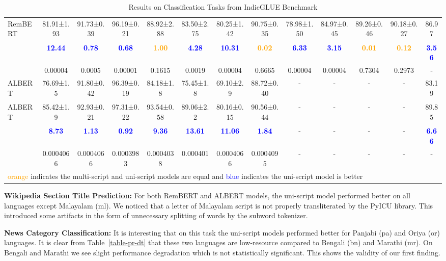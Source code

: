 \documentclass[11pt]{article}
\begin{document}
\begin{table*}[hbt!]
\begin{adjustbox}{max width=\textwidth}
\begin{tabular}{l c c c c c c c c c c c c}
RemBERT\textsubscript{}   & 81.91±1.93 & 91.73±0.39 & 96.19±0.21 & 88.92±2.88 & 83.50±2.75 & 80.25±1.42 & 90.75±0.35 & 78.98±1.50 & 84.97±0.45 & 89.26±0.46 & 90.18±0.27 & 86.97\\
 &\textcolor{blue}{\textbf{12.44}}	&\textcolor{blue}{\textbf{0.78}}	&\textcolor{blue}{\textbf{0.68}}	&\textcolor{orange}{\textbf{1.00}}	&\textcolor{blue}{\textbf{4.28}}	&\textcolor{blue}{\textbf{10.31}}	&\textcolor{orange}{\textbf{0.02}} &\textcolor{blue}{\textbf{6.33}} &\textcolor{blue}{\textbf{3.15}} &\textcolor{orange}{\textbf{0.01}} &\textcolor{orange}{\textbf{0.12}} & \textcolor{blue}{\textbf{3.56}} \\
 &0.00004	&0.0005	&0.00001	&0.1615	&0.0019	&0.00004	&0.6665 &0.00004 &0.00004 & 0.7304 & 0.2973 & -\\
\midrule[1pt]
ALBERT\textsubscript{}           & 76.69±1.5 & 91.80±0.42 & 96.39±0.19 & 84.18±1.8 & 75.45±1.8 & 69.10±2.9 & 88.72±0.40 & - &- & - & - & 83.19\\
ALBERT\textsubscript{}   & 85.42±1.9 & 92.93±0.21 & 97.31±0.22 & 93.54±0.58 & 89.06±2.2 & 80.16±0.15 & 90.56±0.44 & - &- & - & - & 89.85\\
 & \textcolor{blue}{\textbf{8.73}} & \textcolor{blue}{\textbf{1.13}} & \textcolor{blue}{\textbf{0.92}} & \textcolor{blue}{\textbf{9.36}} & \textcolor{blue}{\textbf{13.61}} & \textcolor{blue}{\textbf{11.06}} & \textcolor{blue}{\textbf{1.84}} & - & - & - & - & \textcolor{blue}{\textbf{6.66}}\\
 & 0.0004066	& 0.0004066	& 0.0003983	& 0.0004038	& 0.000401	& 0.0004066	& 0.0004095 & - & - & - & - & -\\
\bottomrule[2pt]
\multicolumn{13}{l}{\textcolor{orange}{orange} indicates the multi-script and uni-script models are equal and \textcolor{blue}{blue} indicates the uni-script model is better}
\end{tabular}\end{adjustbox}
\caption{Results on Classification Tasks from IndicGLUE Benchmark}
\label{table-res}
\end{table*}


\textbf{Wikipedia Section Title Prediction:}
For both RemBERT and ALBERT models, the uni-script model performed better on all languages except Malayalam (ml). We noticed that a letter of Malayalam script is not properly transliterated by the PyICU library. This introduced some artifacts in the form of unnecessary splitting of words by the subword tokenizer.

\textbf{News Category Classification:} 
It is interesting that on this task the uni-script models performed better for Panjabi (pa) and Oriya (or) languages. It is clear from Table~\ref{table-pr-dt} that these two languages are low-resource compared to Bengali (bn) and Marathi (mr). On Bengali and Marathi we see slight performance degradation which is not statistically significant. This shows the validity of our first finding.
\end{document}
